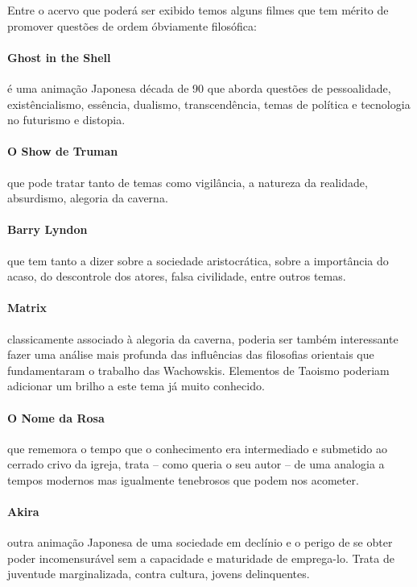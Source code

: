 \documentclass[12pt,a4paper]{article}
\begin{document}
	Entre o acervo que poderá ser exibido temos alguns filmes que 
	tem mérito de promover questões de ordem óbviamente filosófica:

	\paragraph{Ghost in the Shell} é uma animação 
		Japonesa década de 90 que aborda questões de 
		pessoalidade, existêncialismo, essência, 
		dualismo, transcendência, temas de política e 
		tecnologia no futurismo e distopia.

	\paragraph{O Show de Truman} que pode tratar tanto de 
		temas como vigilância, a natureza da realidade,
		absurdismo, alegoria da caverna.

	\paragraph{Barry Lyndon} que tem tanto a dizer sobre a 
		sociedade aristocrática, sobre a importância do
		acaso, do descontrole dos atores, falsa 
		civilidade, entre outros temas.

	\paragraph{Matrix} classicamente associado à alegoria 
		da caverna, poderia ser também interessante 
		fazer uma análise mais profunda das influências 
		das filosofias orientais que fundamentaram o 
		trabalho das Wachowskis. Elementos de Taoismo 
		poderiam adicionar um brilho a este tema já 
		muito conhecido.

	\paragraph{O Nome da Rosa} que rememora o tempo que 
		o conhecimento era intermediado e submetido ao 
		cerrado crivo da igreja, trata -- como queria 
		o seu autor -- de uma analogia a tempos modernos 
		mas igualmente tenebrosos que podem nos acometer.

	\paragraph{Akira} outra animação Japonesa de uma 
		sociedade em declínio e o perigo de se obter 
		poder incomensurável sem a capacidade e 
		maturidade de emprega-lo. Trata de juventude 
		marginalizada, contra cultura, jovens 
		delinquentes.
\end{document}
